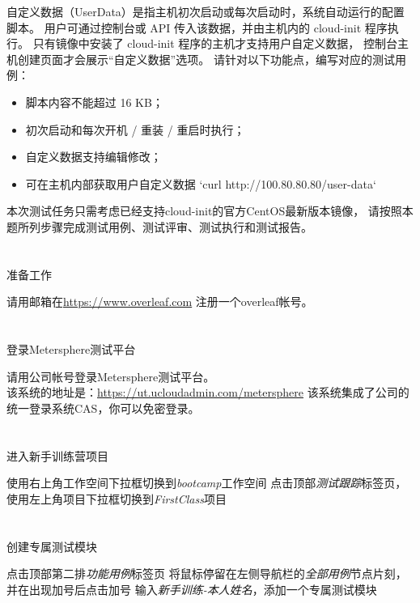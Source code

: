 \documentclass[12pt,addpoints,fleqn]{exam}
\begin{document}
\begin{questions}
\begin{parts}
\end{parts}

\newpage
\question[40] 
自定义数据（UserData）是指主机初次启动或每次启动时，系统自动运行的配置脚本。
用户可通过控制台或 API 传入该数据，并由主机内的 cloud-init 程序执行。
只有镜像中安装了 cloud-init 程序的主机才支持用户自定义数据，
控制台主机创建页面才会展示“自定义数据”选项。
请针对以下功能点，编写对应的测试用例：

\begin{itemize}
  \item 脚本内容不能超过 16 KB；
  \item 初次启动和每次开机 / 重装 / 重启时执行；
  \item 自定义数据支持编辑修改；
  \item 可在主机内部获取用户自定义数据 `curl http://100.80.80.80/user-data`
\end{itemize}
本次测试任务只需考虑已经支持cloud-init的官方CentOS最新版本镜像，
请按照本题所列步骤完成测试用例、测试评审、测试执行和测试报告。

\begin{parts}
  \part{}准备工作

  请用邮箱在\href{https://www.overleaf.com}{https://www.overleaf.com} 注册一个overleaf帐号。
  
  \part{}登录Metersphere测试平台

  请用公司帐号登录Metersphere测试平台。\\
  该系统的地址是：\href{https://ut.ucloudadmin.com/metersphere}{https://ut.ucloudadmin.com/metersphere}
  该系统集成了公司的统一登录系统CAS，你可以免密登录。
  
  \part{}进入新手训练营项目
  \begin{subparts}
    \subpart{}使用右上角工作空间下拉框切换到\emph{bootcamp}工作空间
    \subpart{}点击顶部\emph{测试跟踪}标签页，使用左上角项目下拉框切换到\emph{FirstClass}项目
  \end{subparts}

  \part{}创建专属测试模块
  \begin{subparts}
    \subpart{}点击顶部第二排\emph{功能用例}标签页
    \subpart{}将鼠标停留在左侧导航栏的\emph{全部用例}节点片刻，并在出现加号后点击加号
    \subpart{}输入\emph{新手训练-本人姓名}，添加一个专属测试模块
  \end{subparts}


\end{parts}
\end{questions}
\end{document}
